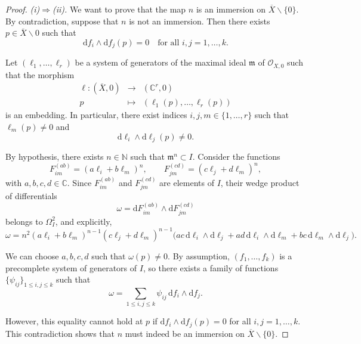 \documentclass[10pt,a4paper]{amsart}
\renewcommand{\setminus}{\smallsetminus}
\begin{document}
\begin{proof}


\medskip
\noindent\emph{(i)$\Rightarrow$(ii).}
 We want to prove that the map $n$ is an immersion on $\overline{X} \backslash \{0\}$. By contradiction, suppose that $n$ is not an immersion. Then there exists $p \in \overline{X} \setminus {0}$ such that
\[
\mathrm{d}f_i \wedge \mathrm{d}f_j(p) = 0 \quad \text{for all } i,j = 1,\dots,k.
\]

Let $(\ell_1,\dots,\ell_r)$ be a system of generators of the maximal ideal $\mathfrak{m}$ of $\mathcal{O}_{X,0}$ such that the morphism
\[
\begin{array}{rcl}
\ell: (\overline{X} ,0) &\to& (\mathbb{C}^r,0) \\
p &\mapsto &(\ell_1(p),\dots,\ell_r(p))
\end{array}
\]
is an embedding. In particular, there exist indices $i,j,m \in \{1,\dots,r\}$ such that $\ell_m(p) \neq 0$ and
\[
\mathrm{d}\ell_i \wedge \mathrm{d}\ell_j(p) \neq 0.
\]

By hypothesis, there exists $n \in \mathbb{N}$ such that $\mathfrak{m}^n \subset I$. Consider the functions
\[
F_{im}^{(ab)} = (a\ell_i + b\ell_m)^n, \qquad F_{jm}^{(cd)} = (c\ell_j + d\ell_m)^n,
\]
with $a,b,c,d \in \mathbb{C}$. Since $F_{im}^{(ab)}$ and $F_{jm}^{(cd)}$ are elements of $I$, their wedge product of differentials
\[
\omega = \mathrm{d}F_{im}^{(ab)} \wedge \mathrm{d}F_{jm}^{(cd)}
\]
belongs to $\Omega_I^2$, and explicitly,
\[
\omega = n^2 (a\ell_i + b \ell_m)^{n-1} (c\ell_j + d \ell_m)^{n-1} 
\bigl( ac \, \mathrm{d}\ell_i \wedge \mathrm{d}\ell_j + ad \, \mathrm{d}\ell_i \wedge \mathrm{d}\ell_m + bc \, \mathrm{d}\ell_m \wedge \mathrm{d}\ell_j \bigr).
\]

We can choose $a,b,c,d$ such that $\omega(p) \neq 0$. By assumption, $(f_1,\dots,f_k)$ is a precomplete system of generators of $I$, so there exists a family of functions $\{\psi_{ij}\}_{1\le i,j \le k}$ such that
\[
\omega = \sum_{1 \le i,j \le k} \psi_{ij} \, \mathrm{d}f_i \wedge \mathrm{d}f_j.
\]

However, this equality cannot hold at $p$ if $\mathrm{d}f_i \wedge \mathrm{d}f_j(p) = 0$ for all $i,j = 1,\dots,k$. This contradiction shows that $n$ must indeed be an immersion on $\overline{X} \backslash \{0\}$.



\end{proof}
\end{document}
